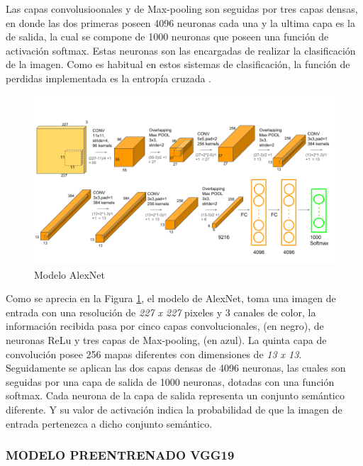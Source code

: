 Las capas convolusioonales y de Max-pooling son seguidas por tres capas densas, en donde las dos primeras poseen 4096 neuronas cada una y la ultima capa es la de salida, la cual se compone de 1000 neuronas que poseen una función de activación softmax. Estas neuronas son las encargadas de realizar la clasificación de la imagen. Como es habitual en estos sistemas de clasificación, la función de perdidas implementada es la entropía cruzada \cite{ref_1}.\\

\newpage

\begin{figure}[ht]
	\centering
	\includegraphics[scale=0.4]{Figs/5.png}
	\caption{Modelo AlexNet}
	\label{fig:AlexNet}
\end{figure}

Como se aprecia en la Figura \ref{fig:AlexNet}, el modelo de AlexNet, toma una imagen de entrada con una resolución de \textit{227 x 227} pixeles y 3 canales de color, la información recibida pasa por cinco capas convolucionales, (en negro), de neuronas ReLu y tres capas de Max-pooling, (en azul). La quinta capa de convolución posee 256 mapas diferentes con dimensiones de \textit{13 x 13}. Seguidamente se aplican las dos capas densas de 4096 neuronas, las cuales son seguidas por una capa de salida de 1000 neuronas, dotadas con una función softmax. Cada neurona de la capa de salida representa un conjunto semántico diferente. Y su valor de activación indica la probabilidad de que la imagen de entrada pertenezca a dicho conjunto semántico.\\


\subsubsection{\MakeUppercase{Modelo preentrenado VGG19}}

